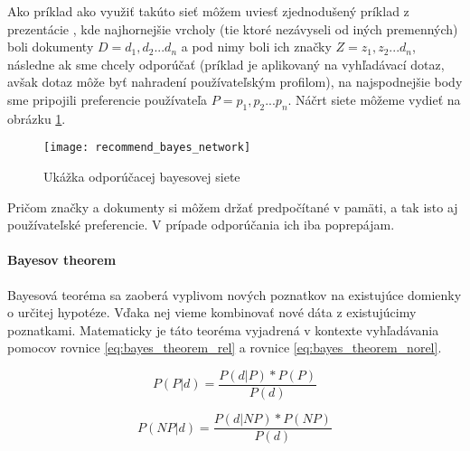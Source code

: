 Ako príklad ako využiť takúto sieť môžem uviesť zjednodušený príklad z
prezentácie \cite{probability_ir}, kde najhornejšie vrcholy (tie ktoré nezávyseli od iných 
premenných) boli dokumenty \(D = {d_1, d_2 ... d_n}\) a pod nimy
boli ich značky \(Z = {z_1, z_2... d_n}\), následne ak sme chcely odporúčať (príklad je 
aplikovaný na vyhľadávací dotaz, avšak dotaz môže byť nahradení používateľským profilom),
na najspodnejšie body sme pripojili preferencie používateľa \(P = {p_1, p_2... p_n}\).
Náčrt siete môžeme vydieť na obrázku \ref{fig:recommend_bayes_network}.

\begin{figure}
    \begin{center}
        \texttt{[image: recommend\_bayes\_network]}
        \caption{Ukážka odporúčacej bayesovej siete}
        \label{fig:recommend_bayes_network}
    \end{center}
\end{figure}

Pričom značky a dokumenty si môžem držať predpočítané v pamäti, a tak isto aj používateľské 
preferencie. V prípade odporúčania ich iba poprepájam.

\paragraph{Bayesov theorem}

Bayesová teoréma sa zaoberá vyplivom nových poznatkov na existujúce 
domienky o určitej hypotéze. Vďaka nej vieme kombinovať nové dáta z existujúcimy poznatkami.
Matematicky je táto teoréma vyjadrená v kontexte vyhľadávania 
pomocov rovnice \ref{eq:bayes_theorem_rel} a rovnice \ref{eq:bayes_theorem_norel}.

\begin{equation} \label{eq:bayes_theorem_rel}
P(P|d) = \frac{P(d|P) * P(P)}{P(d)}
\end{equation}

\begin{equation} \label{eq:bayes_theorem_norel}
P(NP|d) = \frac{P(d|NP) * P(NP)}{P(d)}
\end{equation}

